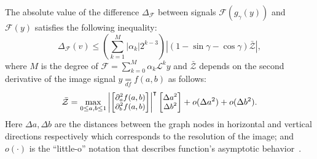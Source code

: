 \documentclass[10pt,journal,compsoc]{IEEEtran}
\newcommand{\df}{\mathop{=}\limits_{df}}
\newcommand{\norm}[1]{\left|#1\right|}
\begin{document}
\begin{theorem}
		
		The absolute value of the difference $\Delta_\mathcal{F}$ between signals $\mathcal{F}(g_\gamma (y))$ and $\mathcal{F}(y)$ satisfies the following inequality:
		\begin{equation}
		\Delta_\mathcal{F} (v) \leq \left(\sum_{k=1}^M \norm{\alpha_k} 2^{k-3} \right) \left| (1 - \sin\gamma - \cos\gamma) \bar{\mathcal{Z}} \right|,
		\label{eq:filt_diff_rot}
		\end{equation} 
		\noindent
		where $M$ is the degree of $\mathcal{F} = \sum_{k=0}^M \alpha_k \mathcal{L}^k y$ and $\bar{\mathcal{Z}}$ depends on the second derivative of the image signal $y \df f(a,b)$ as follows:
		\begin{equation}
		\small
		\bar{\mathcal{Z}} =
		\max_{0 \leq a,b \leq 1} \left| 
		\begin{bmatrix}
		\partial_a^2 f (a,b) \\
		\partial_b^2 f (a,b) \\
		\end{bmatrix}
		\right|^{\intercal}
		\begin{bmatrix}
		\Delta a^2 \\
		\Delta b^2 \\
		\end{bmatrix} + o(\Delta a^2) + o(\Delta b^2).
		\label{eq:sec_der}
		\end{equation}	
		\noindent
		Here $\Delta a, \Delta b$ are the distances between the graph nodes in horizontal and vertical directions respectively which corresponds to the resolution of the image; and $o(\cdot)$ is the ``little-o'' notation that describes function's asymptotic behavior~\cite{bb:Landau09}.
		\label{t:im_rot}
	\end{theorem}
	
\end{document}
